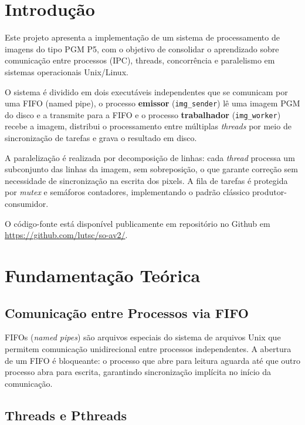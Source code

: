 \documentclass[12 pt]{abntex2}
\begin{document}
\imprimirfolhaderosto

\tableofcontents*
\clearpage

\section{Introdução}

Este projeto apresenta a implementação de um sistema de processamento de
imagens do tipo PGM P5, com o objetivo de consolidar o aprendizado sobre
comunicação entre processos (IPC), threads, concorrência e
paralelismo em sistemas operacionais Unix/Linux.
 
O sistema é dividido em dois executáveis independentes que se comunicam por
uma FIFO (named pipe), o processo \textbf{emissor} (\texttt{img\_sender}) lê uma
imagem PGM do disco e a transmite para a FIFO e o processo \textbf{trabalhador}
(\texttt{img\_worker}) recebe a imagem, distribui o processamento entre
múltiplas \textit{threads} por meio de sincronização de tarefas e grava o resultado em disco.
 
A paralelização é realizada por decomposição de linhas: cada \textit{thread}
processa um subconjunto das linhas da imagem, sem sobreposição, o que garante
correção sem necessidade de sincronização na escrita dos pixels. A fila de
tarefas é protegida por \textit{mutex} e semáforos contadores, implementando
o padrão clássico produtor-consumidor.

O código-fonte está disponível publicamente em repositório no Github em \url{https://github.com/lutsc/so-av2/}.

\section{Fundamentação Teórica}
 
\subsection{Comunicação entre Processos via FIFO}
 
FIFOs (\textit{named pipes}) são arquivos especiais do sistema de arquivos
Unix que permitem comunicação unidirecional entre processos independentes. A
abertura de um FIFO é bloqueante: o processo que abre para leitura aguarda
até que outro processo abra para escrita, garantindo sincronização implícita
no início da comunicação.
 
\subsection{Threads e Pthreads}
 
\end{document}
